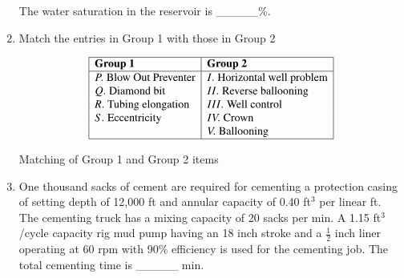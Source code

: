 \documentclass[journal]{IEEEtran}
\begin{document}
\begin{enumerate}
    The water saturation in the reservoir is \_\_\_\_\_\%.  
    
    \hfill{}
    
    \item Match the entries in Group 1 with those in Group 2
    
   \begin{table}[h!]
\centering
\[
\begin{array}{|l|l|}
\hline
\textbf{Group 1} & \textbf{Group 2} \\
\hline
P. \; \text{Blow Out Preventer} & I. \; \text{Horizontal well problem} \\
Q. \; \text{Diamond bit}        & II. \; \text{Reverse ballooning} \\
R. \; \text{Tubing elongation}  & III. \; \text{Well control} \\
S. \; \text{Eccentricity}       & IV. \; \text{Crown} \\
                                & V. \; \text{Ballooning} \\
\hline
\end{array}
\]
\caption{Matching of Group 1 and Group 2 items}
\label{tab:groups}
\end{table}

    
    \begin{enumerate}  \end{enumerate}              
    
    \hfill{}
    
    \item One thousand sacks of cement are required for cementing a protection casing of setting depth of 12,000 ft  and annular capacity of 0.40 ft$^3$ per linear ft. The cementing truck has a mixing capacity of 20 sacks per min. A 1.15 ft$^3$/cycle capacity rig mud pump having an 18 inch stroke and a $\frac{1}{2}$ inch liner operating at 60 rpm with 90\% efficiency is used for the cementing job. The total cementing time is \_\_\_\_\_ min.
    
    \hfill{}
    

\end{enumerate}
\end{document}
